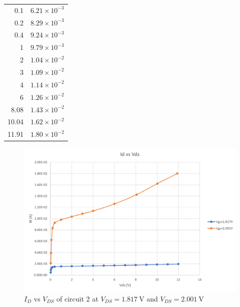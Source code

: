 \documentclass{article}
\begin{document}
\begin{table}[H]
\begin{minipage}[t]{0.5\textwidth}
\begin{tabular}{rr}
        0.1   & $6.21\times10^{-3}$ \\
        0.2   & $8.29\times10^{-3}$ \\
        0.4   & $9.24\times10^{-3}$ \\
        1     & $9.79\times10^{-3}$ \\
        2     & $1.04\times10^{-2}$ \\
        3     & $1.09\times10^{-2}$ \\
        4     & $1.14\times10^{-2}$ \\
        6     & $1.26\times10^{-2}$ \\
        8.08  & $1.43\times10^{-2}$ \\
        10.04 & $1.62\times10^{-2}$ \\
        11.91 & $1.80\times10^{-2}$ \\
      \bottomrule
    \end{tabular}
    \end{minipage}
  \label{tab:ckt2}%
\end{table}

\begin{figure}[H]
  \centering
  \includegraphics[width=\textwidth]{ECE2200L_Lab7_IV_2.png}
  \caption{$I_D$ vs $V_{DS}$ of circuit 2 at $V_{DS} = \SI{1.817}{\volt}$ and $V_{DS} = \SI{2.001}{\volt}$}
  \label{fig:IV2}
\end{figure}
\end{document}
